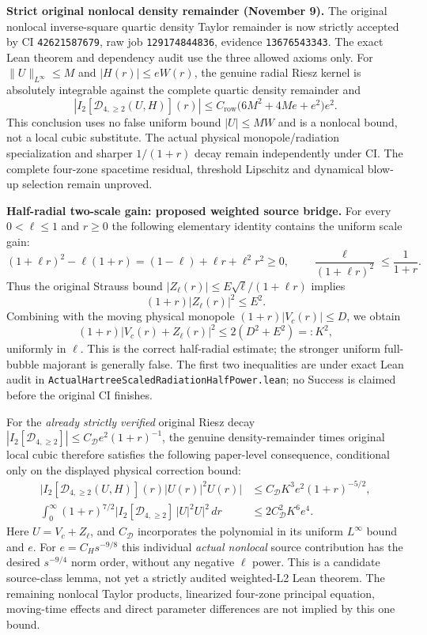 \documentclass[11pt]{amsart}
\begin{document}
\medskip
\noindent\textbf{Strict original nonlocal density remainder (November 9).}
The original nonlocal inverse-square quartic density Taylor remainder
is now strictly accepted by CI \texttt{42621587679}, raw job
\texttt{129174844836}, evidence \texttt{13676543343}.
The exact Lean theorem and dependency audit use the three allowed
axioms only. For $\|U\|_{L^\infty}\le M$ and
$|H(r)|\le eW(r)$, the genuine radial Riesz kernel is absolutely
integrable against the complete quartic density remainder and
\[
 \left|I_2[\mathcal D_{4,\ge2}(U,H)](r)\right|
 \le C_{\mathrm{row}}\bigl(6M^2+4Me+e^2\bigr)e^2.
\]
This conclusion uses no false uniform bound $|U|\le MW$ and
is a nonlocal bound, not a local cubic substitute.
The actual physical monopole/radiation specialization and sharper
$1/(1+r)$ decay remain independently under CI.  The
complete four-zone spacetime residual, threshold Lipschitz and
dynamical blow-up selection remain unproved.


\medskip
\noindent\textbf{Half-radial two-scale gain: proposed weighted source bridge.}
For every $0<\ell\le1$ and $r\ge0$ the following elementary identity
contains the uniform scale gain:
\[
 (1+\ell r)^2-\ell(1+r)
    = (1-\ell)+\ell r+\ell^2r^2\ge0,
 \qquad
 \frac{\ell}{(1+\ell r)^2}\le\frac1{1+r}.
\]
Thus the original Strauss bound
$|Z_\ell(r)|\le E\sqrt\ell/(1+\ell r)$ implies
\[
 (1+r)|Z_\ell(r)|^2\le E^2.
\]
Combining with the moving physical monopole
$(1+r)|V_c(r)|\le D$, we obtain
\[
 (1+r)|V_c(r)+Z_\ell(r)|^2
     \le 2(D^2+E^2)=:K^2,
\]
uniformly in $\ell$.  This is the correct half-radial estimate;
the stronger uniform full-bubble majorant is generally false.
The first two inequalities are under exact Lean audit in
\texttt{ActualHartreeScaledRadiationHalfPower.lean};
no Success is claimed before the original CI finishes.

For the \emph{already strictly verified} original Riesz decay
$|I_2[\mathcal D_{4,\ge2}]|\le C_\mathcal D e^2(1+r)^{-1}$,
the genuine density-remainder times original local cubic therefore
satisfies the following paper-level consequence, conditional only
on the displayed physical correction bound:
\[
 \begin{split}
 \bigl|I_2[\mathcal D_{4,\ge2}(U,H)](r)
                   |U(r)|^2U(r)\bigr|
 &\le C_\mathcal D K^3 e^2(1+r)^{-5/2},\\
 \int_0^\infty(1+r)^{7/2}
 \bigl|I_2[\mathcal D_{4,\ge2}]\,|U|^2U\bigr|^2\,dr
 &\le 2C_\mathcal D^2K^6e^4.
 \end{split}
\]
Here $U=V_c+Z_\ell$, and $C_\mathcal D$ incorporates the
polynomial in its uniform $L^\infty$ bound and $e$.
For $e=C_Hs^{-9/8}$ this individual \emph{actual nonlocal}
source contribution has the desired $s^{-9/4}$ norm order,
without any negative $\ell$ power.
This is a candidate source-class lemma, not yet a strictly audited
weighted-L2 Lean theorem. The remaining nonlocal Taylor products,
linearized four-zone principal equation, moving-time effects and
direct parameter differences are not implied by this one bound.
\end{document}
